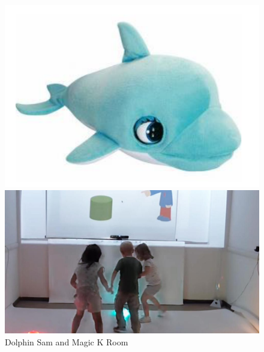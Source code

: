 \begin{figure}[H]
\centering
\begin{minipage}[c]{.40\textwidth}
\includegraphics[width=1\textwidth]{immagini/delfino.png}
\end{minipage}%
\hspace{10mm}%
\begin{minipage}[c]{.40\textwidth}
\includegraphics[width=1\textwidth]{immagini/stanzamagica.jpg}
\end{minipage}
\caption{Dolphin Sam and Magic K Room}\label{fig:smartimages}
\end{figure}

